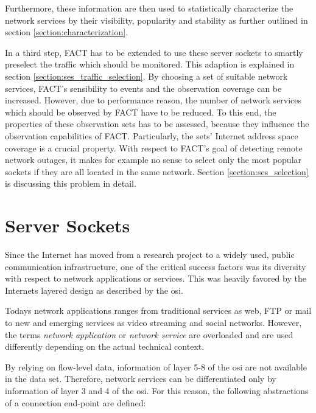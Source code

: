 Furthermore, these information are then used to statistically characterize the network services by their visibility, popularity and stability as further outlined in section \ref{section:characterization}.

In a third step, FACT has to be extended to use these server sockets to smartly preselect the traffic which should be monitored. 
This adaption is explained in section \ref{section:ses_traffic_selection}. 
By choosing a set of suitable network services, \gls{FACT}'s sensibility to events and the observation coverage can be increased. 
However, due to performance reason, the number of network services which should be observed by \gls{FACT} have to be reduced. 
To this end, the properties of these observation sets has to be assessed, because they influence the observation capabilities of \gls{FACT}. 
Particularly, the sets' Internet address space coverage is a crucial property. 
With respect to FACT's goal of detecting remote network outages, it makes for example no sense to select only the most popular sockets if they are all located in the same network. 
Section \ref{section:ses_selection} is discussing this problem in detail. 

\section{Server Sockets}
Since the Internet has moved from a research project to a widely used, public communication infrastructure, one of the critical success factors was its diversity with respect to network applications or services. This was heavily favored by the Internets layered design as described by the \gls{osi}.

Todays network applications ranges from traditional services as web, \gls{FTP} or mail to new and emerging services as video streaming and social networks. However, the terms \emph{network application} or \emph{network service} are overloaded and are used differently depending on the actual technical context.

By relying on flow-level data, information of layer 5-8 of the \gls{osi} are not available in the data set. Therefore, network services can be differentiated only by information of layer 3 and 4 of the \gls{osi}. For this reason, the following abstractions of a connection end-point are defined:

